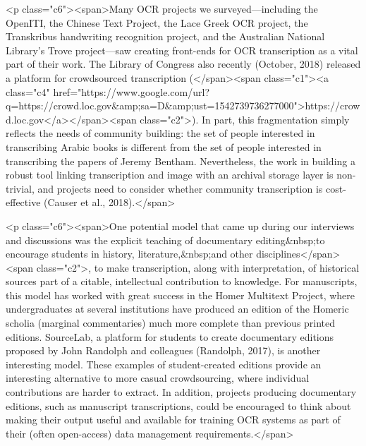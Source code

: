 \documentclass[twoside,11pt]{report}
\begin{document}
<p class="c6"><span>Many OCR projects we surveyed---including the OpenITI, the Chinese Text Project, the Lace Greek OCR project, the Transkribus handwriting recognition project, and the Australian National Library's Trove project---saw creating front-ends for OCR transcription as a vital part of their work. The Library of Congress also recently (October, 2018) released a platform for crowdsourced transcription (</span><span class="c1"><a class="c4" href="https://www.google.com/url?q=https://crowd.loc.gov&amp;sa=D&amp;ust=1542739736277000">https://crowd.loc.gov</a></span><span class="c2">). In part, this fragmentation simply reflects the needs of community building: the set of people interested in transcribing Arabic books is different from the set of people interested in transcribing the papers of Jeremy Bentham. Nevertheless, the work in building a robust tool linking transcription and image with an archival storage layer is non-trivial, and projects need to consider whether community transcription is cost-effective (Causer et al., 2018).</span>

<p class="c6"><span>One potential model that came up during our interviews and discussions was the explicit teaching of documentary editing&nbsp;to encourage students in history, literature,&nbsp;and other disciplines</span><span class="c2">, to make transcription, along with interpretation, of historical sources part of a citable, intellectual contribution to knowledge. For manuscripts, this model has worked with great success in the Homer Multitext Project, where undergraduates at several institutions have produced an edition of the Homeric scholia (marginal commentaries) much more complete than previous printed editions. SourceLab, a platform for students to create documentary editions proposed by John Randolph and colleagues (Randolph, 2017), is another interesting model. These examples of student-created editions provide an interesting alternative to more casual crowdsourcing, where individual contributions are harder to extract. In addition, projects producing documentary editions, such as manuscript transcriptions, could be encouraged to think about making their output useful and available for training OCR systems as part of their (often open-access) data management requirements.</span>
\end{document}
